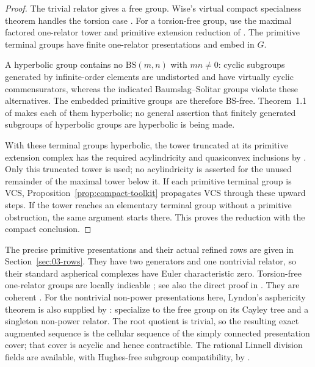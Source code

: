 \begin{proof}
The trivial relator gives a free group. Wise's virtual compact specialness theorem handles the torsion case \cite[Corollary~19.2]{Wise2021}. For a torsion-free group, use the maximal factored one-relator tower and primitive extension reduction of \cite[Theorem~4.8, Corollary~4.9, Lemma~5.2 and Theorem~5.6]{LintonHyperbolic2026}. The primitive terminal groups have finite one-relator presentations and embed in $G$.

A hyperbolic group contains no $\mathrm{BS}(m,n)$ with $mn\ne0$: cyclic subgroups generated by infinite-order elements are undistorted and have virtually cyclic commensurators, whereas the indicated Baumslag--Solitar groups violate these alternatives. The embedded primitive groups are therefore BS-free. Theorem~1.1 of \cite{OpenAIHyperbolicity} makes each of them hyperbolic; no general assertion that finitely generated subgroups of hyperbolic groups are hyperbolic is being made.

With these terminal groups hyperbolic, the tower truncated at its primitive extension complex has the required acylindricity and quasiconvex inclusions by \cite[Corollary~4.9]{LintonHyperbolic2026}. Only this truncated tower is used; no acylindricity is asserted for the unused remainder of the maximal tower below it. If each primitive terminal group is VCS, Proposition~\ref{prop:compact-toolkit} propagates VCS through these upward steps. If the tower reaches an elementary terminal group without a primitive obstruction, the same argument starts there. This proves the reduction with the compact conclusion.
\end{proof}

The precise primitive presentations and their actual refined rows are given in Section~\ref{sec:03-rows}. They have two generators and one nontrivial relator, so their standard aspherical complexes have Euler characteristic zero. Torsion-free one-relator groups are locally indicable \cite{Brodskii1984,Howie1982}; see also the direct proof in \cite[Theorem~3.1 and Corollary~3.2]{Howie2000}. They are coherent \cite[Theorem~1.1(1)]{JaikinLinton2025}. For the nontrivial non-power presentations here, Lyndon's asphericity theorem \cite{Lyndon1950} is also supplied by \cite[Corollary~6.5]{AntolinDicksLinnell2010}: specialize to the free group on its Cayley tree and a singleton non-power relator. The root quotient is trivial, so the resulting exact augmented sequence is the cellular sequence of the simply connected presentation cover; that cover is acyclic and hence contractible. The rational Linnell division fields are available, with Hughes-free subgroup compatibility, by \cite{JaikinLopezAlvarez2020,JaikinUniversality2021}.


